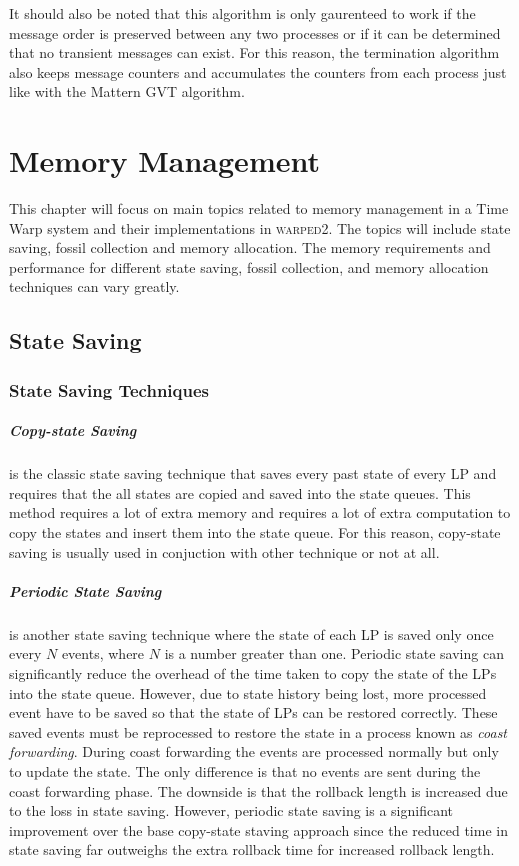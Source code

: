 \documentclass[11pt]{book}
\begin{document}
It should also be noted that this algorithm is only gaurenteed to work if the message order
is preserved between any two processes or if it can be determined that no transient messages
can exist.  For this reason, the termination algorithm also keeps message counters and accumulates
the counters from each process just like with the Mattern GVT algorithm.



\chapter{Memory Management}\label{memory_management}

This chapter will focus on main topics related to memory management in a Time Warp system
and their implementations in \textsc{warped2}.  The topics will include state saving, fossil
collection and memory allocation.  The memory requirements and performance for different state
saving, fossil collection, and memory allocation techniques can vary greatly.

\section{State Saving}

\subsection{State Saving Techniques}

\paragraph{Copy-state Saving} is the classic state saving technique that saves every past
state of every LP and requires that the all states are copied and saved into the state queues.
This method requires a lot of extra memory and requires a lot of extra computation to copy
the states and insert them into the state queue.  For this reason, copy-state saving is
usually used in conjuction with other technique or not at all.

\paragraph{Periodic State Saving} is another state saving technique where the state of each LP
is saved only once every $N$ events, where $N$ is a number greater than one.  Periodic state
saving can significantly reduce the overhead of the time taken to copy the state of the
LPs into the state queue.  However, due to state history being lost, more processed event
have to be saved so that the state of LPs can be restored correctly.  These saved events
must be reprocessed to restore the state in a process known as \emph{coast forwarding}.
During coast forwarding the events are processed normally but only to update the state.
The only difference is that no events are sent during the coast forwarding phase.  The
downside is that the rollback length is increased due to the loss in state saving.  However,
periodic state saving is a significant improvement over the base copy-state staving approach
since the reduced time in state saving far outweighs the extra rollback time for increased
rollback length.
\end{document}
